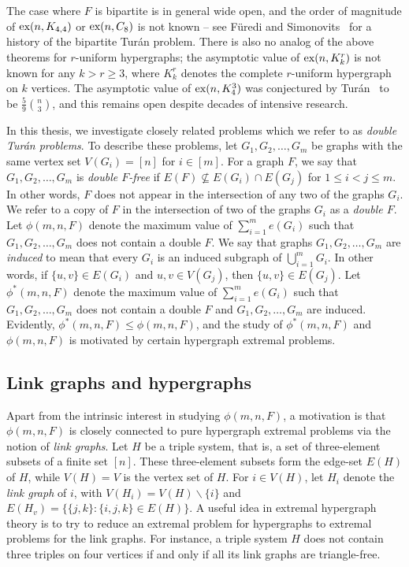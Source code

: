 \documentclass[12pt]{article}
\newcommand*{\ex}{\textnormal{ex}}
\begin{document}
The case where $F$ is bipartite is in general wide open, and the order of magnitude of $\ex(n,K_{4,4})$ or $\ex(n,C_8)$ is not known -- see F\"{u}redi and Simonovits~\cite{FurediSimonovits2013} for a history of the bipartite Tur\'{a}n problem. There is also no analog of the above theorems for $r$-uniform hypergraphs; the asymptotic value of $\ex(n,K_k^r)$ is not known for any $k > r \geq 3$, where $K_k^r$ denotes the complete $r$-uniform hypergraph on $k$ vertices. The asymptotic value of $\ex(n,K_4^3)$ was conjectured by Tur\'{a}n~\cite{Turan1941} to be $\frac{5}{9} \binom{n}{3}$, and this remains open despite decades of intensive research. 

In this thesis, we investigate closely related problems which we refer to as \textit{double Tur\'{a}n problems}. To describe these problems, let $G_1, G_2, \ldots, G_m$ be graphs with the same vertex set $V(G_i) = [n]$ for $i \in [m]$. For a graph $F$, we say that $G_1,G_2,\dots,G_m$ is \textit{double $F$-free} if $E(F) \not \subseteq E(G_i) \cap E(G_j)$ for $1 \leq i < j \leq m$. In other words, $F$ does not appear in the intersection of any two of the graphs $G_i$. We refer to a copy of $F$ in the intersection of two of the graphs $G_i$ as a \textit{double $F$}. Let $\phi(m,n,F)$ denote the maximum value of $\sum_{i = 1}^m e(G_i)$ such that $G_1,G_2,\dots,G_m$ does not contain a double $F$. We say that graphs $G_1,G_2,\dots,G_m$ are \textit{induced} to mean that every $G_i$ is an induced subgraph of $\bigcup_{i = 1}^m G_i$. In other words, if $\{u,v\} \in E(G_i)$ and $u,v \in V(G_j)$, then $\{u,v\} \in E(G_j)$. Let $\phi^*(m,n,F)$ denote the maximum value of $\sum_{i = 1}^m e(G_i)$ such that $G_1,G_2,\dots,G_m$ does not contain a double $F$ and $G_1,G_2,\dots,G_m$ are induced. Evidently, $\phi^*(m,n,F) \leq \phi(m,n,F)$, and the study of $\phi^*(m,n,F)$ and $\phi(m,n,F)$ is motivated by certain hypergraph extremal problems.

\subsection{Link graphs and hypergraphs}

Apart from the intrinsic interest in studying $\phi(m,n,F)$, a motivation is that $\phi(m,n,F)$ is closely connected to pure hypergraph extremal problems via the notion of \textit{link graphs}. Let $H$ be a triple system, that is, a set of three-element subsets of a finite set $[n]$. These three-element subsets form the edge-set $E(H)$ of $H$, while $V(H) = V$ is the vertex set of $H$. For $i \in V(H)$, let $H_i$ denote the \textit{link graph} of $i$, with $V(H_i) = V(H) \backslash \{i\}$ and $E(H_v) = \{\{j,k\} : \{i,j,k\} \in E(H)\}$. A useful idea in extremal hypergraph theory is to try to reduce an extremal problem for hypergraphs to extremal problems for the link graphs. For instance, a triple system $H$ does not contain three triples on four vertices if and only if all its link graphs are triangle-free. 
\end{document}
